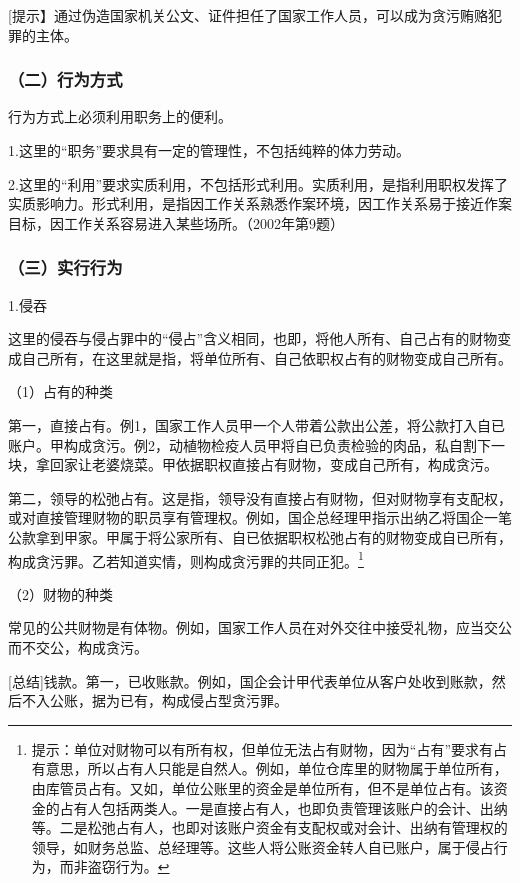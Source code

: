 [提示】通过伪造国家机关公文、证件担任了国家工作人员，可以成为贪污贿赂犯罪的主体。

\subsubsection*{（二）行为方式}

行为方式上必须利用职务上的便利。

1.这里的“职务”要求具有一定的管理性，不包括纯粹的体力劳动。

2.这里的“利用”要求实质利用，不包括形式利用。实质利用，是指利用职权发挥了实质影响力。形式利用，是指因工作关系熟悉作案环境，因工作关系易于接近作案目标，因工作关系容易进入某些场所。（2002年第9题）

\subsubsection*{（三）实行行为}

1.侵吞

这里的侵吞与侵占罪中的“侵占”含义相同，也即，将他人所有、自己占有的财物变成自己所有，在这里就是指，将单位所有、自己依职权占有的财物变成自己所有。

（1）占有的种类

第一，直接占有。例1，国家工作人员甲一个人带着公款出公差，将公款打入自已账户。甲构成贪污。例2，动植物检疫人员甲将自已负责检验的肉品，私自割下一块，拿回家让老婆烧菜。甲依据职权直接占有财物，变成自己所有，构成贪污。

第二，领导的松弛占有。这是指，领导没有直接占有财物，但对财物享有支配权，或对直接管理财物的职员享有管理权。例如，国企总经理甲指示出纳乙将国企一笔公款拿到甲家。甲属于将公家所有、自已依据职权松弛占有的财物变成自已所有，构成贪污罪。乙若知道实情，则构成贪污罪的共同正犯。\footnote{提示：单位对财物可以有所有权，但单位无法占有财物，因为“占有”要求有占有意思，所以占有人只能是自然人。例如，单位仓库里的财物属于单位所有，由库管员占有。又如，单位公账里的资金是单位所有，但不是单位占有。该资金的占有人包括两类人。一是直接占有人，也即负责管理该账户的会计、出纳等。二是松弛占有人，也即对该账户资金有支配权或对会计、出纳有管理权的领导，如财务总监、总经理等。这些人将公账资金转人自已账户，属于侵占行为，而非盗窃行为。}

（2）财物的种类

常见的公共财物是有体物。例如，国家工作人员在对外交往中接受礼物，应当交公而不交公，构成贪污。

[总结]钱款。第一，已收账款。例如，国企会计甲代表单位从客户处收到账款，然后不入公账，据为已有，构成侵占型贪污罪。

